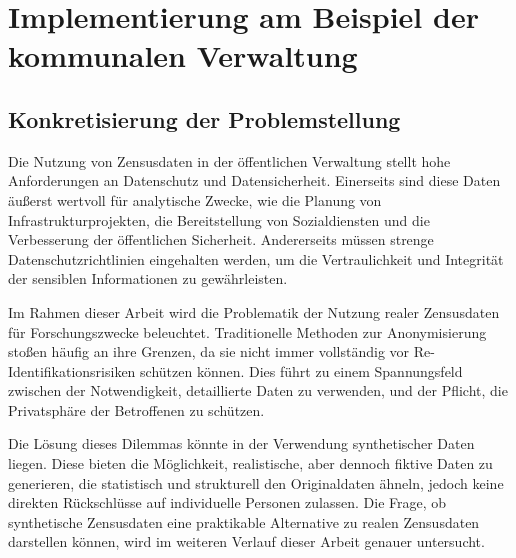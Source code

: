 \chapter{Implementierung am Beispiel der kommunalen Verwaltung}
\label{cha:implementierung}

\section{Konkretisierung der Problemstellung}
\begin{spacing}{1.5}

Die Nutzung von Zensusdaten in der öffentlichen Verwaltung stellt hohe Anforderungen an Datenschutz und Datensicherheit. Einerseits sind diese Daten äußerst wertvoll für analytische Zwecke, wie die Planung von Infrastrukturprojekten, die Bereitstellung von Sozialdiensten und die Verbesserung der öffentlichen Sicherheit. Andererseits müssen strenge Datenschutzrichtlinien eingehalten werden, um die Vertraulichkeit und Integrität der sensiblen Informationen zu gewährleisten.

Im Rahmen dieser Arbeit wird die Problematik der Nutzung realer Zensusdaten für Forschungszwecke beleuchtet. Traditionelle Methoden zur Anonymisierung stoßen häufig an ihre Grenzen, da sie nicht immer vollständig vor Re-Identifikationsrisiken schützen können. Dies führt zu einem Spannungsfeld zwischen der Notwendigkeit, detaillierte Daten zu verwenden, und der Pflicht, die Privatsphäre der Betroffenen zu schützen.

Die Lösung dieses Dilemmas könnte in der Verwendung synthetischer Daten liegen. Diese bieten die Möglichkeit, realistische, aber dennoch fiktive Daten zu generieren, die statistisch und strukturell den Originaldaten ähneln, jedoch keine direkten Rückschlüsse auf individuelle Personen zulassen. Die Frage, ob synthetische Zensusdaten eine praktikable Alternative zu realen Zensusdaten darstellen können, wird im weiteren Verlauf dieser Arbeit genauer untersucht.

\end{spacing}

